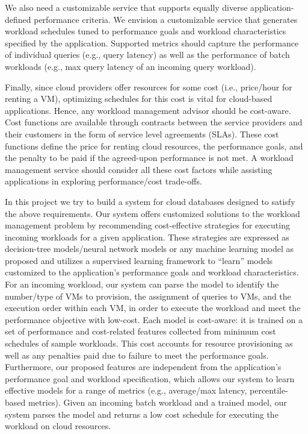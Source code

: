 We also need a customizable service that supports equally diverse application-defined performance criteria. We envision a customizable service that generates workload schedules tuned to performance goals and workload characteristics specified by the application. Supported metrics should capture the performance of individual queries (e.g., query latency) as well as the performance of batch workloads (e.g., max query latency of an incoming query workload).

Finally, since cloud providers offer resources for some cost (i.e., price/hour for renting a VM), optimizing schedules for this cost is vital for cloud-based applications. Hence, any workload management advisor should be cost-aware. Cost functions are available through contracts between the service providers and their customers in the form of service level agreements (SLAs). These cost functions define the price for renting cloud resources, the performance goals, and the penalty to be paid if the agreed-upon performance is not met. A workload management service should consider all these cost factors while assisting applications in exploring performance/cost trade-offs.

In this project we try to build a system for cloud databases designed to satisfy the above requirements. Our system offers customized solutions to the workload management problem by recommending cost-effective strategies for executing incoming workloads for a given application. These strategies are expressed as decision-tree models/neural network models  or any machine learning model as proposed and  utilizes a supervised learning framework to “learn” models customized to the application’s performance goals and workload characteristics. For an incoming workload, our system can parse the model to identify the number/type of VMs to provision, the assignment of queries to VMs, and the execution order within each VM, in order to execute the workload and meet the performance objective with low-cost. Each model is cost-aware: it is trained on a set of performance and cost-related features collected from minimum cost schedules of sample workloads. This cost accounts for resource provisioning as well as any penalties paid due to failure to meet the performance goals. Furthermore, our proposed features are independent from the application’s performance goal and workload specification, which allows our system to learn effective models for a range of metrics (e.g., average/max latency, percentile-based metrics). Given an incoming batch workload and a trained model, our system parses the model and returns a low cost schedule for executing the workload on cloud resources. 
